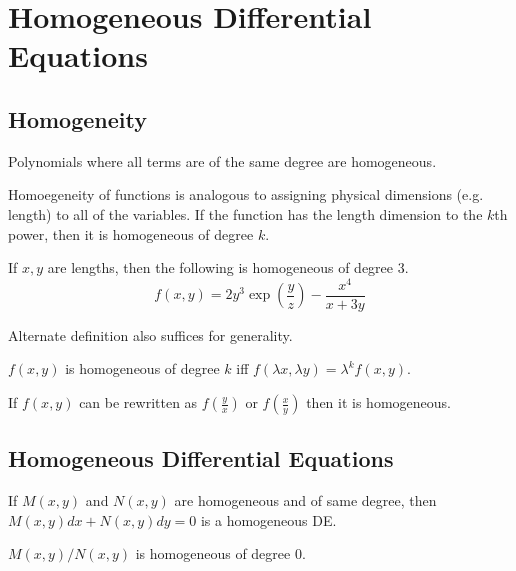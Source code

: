 \section{Homogeneous Differential Equations}

\subsection{Homogeneity}

\begin{definition}
    Polynomials where all terms are of the same degree are homogeneous.
\end{definition}

Homoegeneity of functions is analogous to assigning physical dimensions (e.g. length) to all of the variables.
If the function has the length dimension to the $k$th power, then it is homogeneous of degree $k$.

\begin{example}
    If $x,y$ are lengths, then the following is homogeneous of degree 3.
    \begin{equation}
        f(x,y)=2y^3\exp(\frac{y}{z})-\frac{x^4}{x+3y}
    \end{equation}
\end{example}

Alternate definition also suffices for generality.

\begin{definition}
    $f(x,y)$ is homogeneous of degree $k$ iff $f(\lambda x, \lambda y)=\lambda^kf(x,y)$.
\end{definition}

\begin{definition}
    If $f(x,y)$ can be rewritten as $f(\frac{y}{x})$ or $f(\frac{x}{y})$ then it is homogeneous.
\end{definition}

\subsection{Homogeneous Differential Equations}

\begin{corollary}
    If $M(x,y)$ and $N(x,y)$ are homogeneous and of same degree, then $M(x,y)dx+N(x,y)dy=0$
    is a homogeneous DE.
\end{corollary}
    
\begin{corollary}
    $M(x,y)/N(x,y)$ is homogeneous of degree 0.
\end{corollary}

